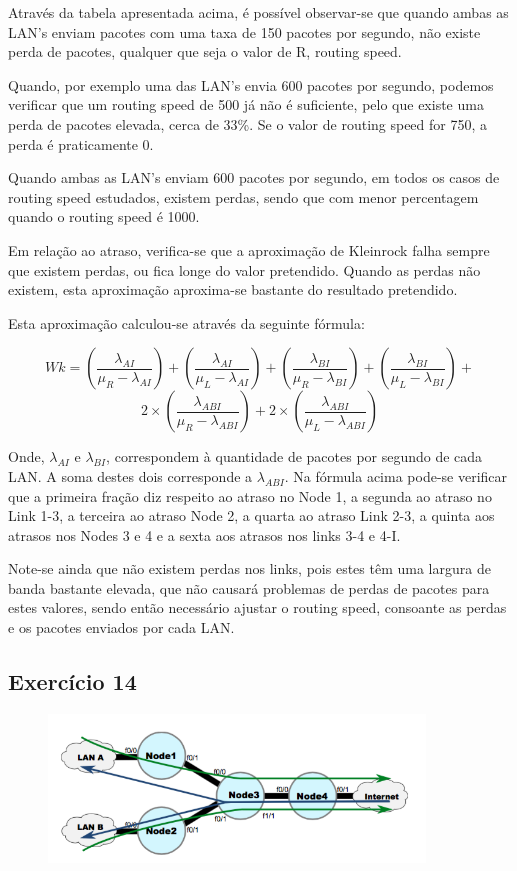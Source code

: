 \documentclass[pdftex,12pt,a4paper]{report}
\begin{document}

Através da tabela apresentada acima, é possível observar-se que quando ambas as LAN's enviam pacotes com uma taxa de 150 pacotes por segundo, não existe perda de pacotes, qualquer que seja o valor de R, routing speed.

Quando, por exemplo uma das LAN's envia 600 pacotes por segundo, podemos verificar que um routing speed de 500 já não é suficiente, pelo que existe uma perda de pacotes elevada, cerca de 33\%. Se o valor de routing speed for 750, a perda é praticamente 0. 

Quando ambas as LAN's enviam 600 pacotes por segundo, em todos os casos de routing speed estudados, existem perdas, sendo que com menor percentagem quando o routing speed é 1000.

Em relação ao atraso, verifica-se que a aproximação de Kleinrock falha sempre que existem perdas, ou fica longe do valor pretendido. Quando as perdas não existem, esta aproximação aproxima-se bastante do resultado pretendido.

Esta aproximação calculou-se através da seguinte fórmula:

\[Wk = \left(\frac{\lambda_{AI}}{\mu_{R} - \lambda_{AI}}\right) + 
\left(\frac{\lambda_{AI}}{\mu_{L} - \lambda_{AI}}\right) + 
\left(\frac{\lambda_{BI}}{\mu_{R} - \lambda_{BI}}\right) + 
\left(\frac{\lambda_{BI}}{\mu_{L} - \lambda_{BI}}\right) +\]
\[2 \times \left(\frac{\lambda_{ABI}}{\mu_{R} - \lambda_{ABI}}\right) + 2 \times \left(\frac{\lambda_{ABI}}{\mu_{L} - \lambda_{ABI}}\right)\]

Onde, $\lambda_{AI}$ e $\lambda_{BI}$, correspondem à quantidade de pacotes por segundo de cada LAN. A soma destes dois corresponde a $\lambda_{ABI}$. Na fórmula acima pode-se verificar que a primeira fração diz respeito ao atraso no Node 1, a segunda ao atraso no Link 1-3, a terceira ao atraso Node 2, a quarta ao atraso Link 2-3, a quinta aos atrasos nos Nodes 3 e 4 e a sexta aos atrasos nos links 3-4 e 4-I.

Note-se ainda que não existem perdas nos links, pois estes têm uma largura de banda bastante elevada, que não causará problemas de perdas de pacotes para estes valores, sendo então necessário ajustar o routing speed, consoante as perdas e os pacotes enviados por cada LAN.

\newpage
\subsection{Exercício 14}
\begin{figure}[!htb]
\center
 \includegraphics[width=100mm,scale=1]{imagensGuia/ex14.png}
 \label{fig:ex14}
\end{figure}
\end{document}
